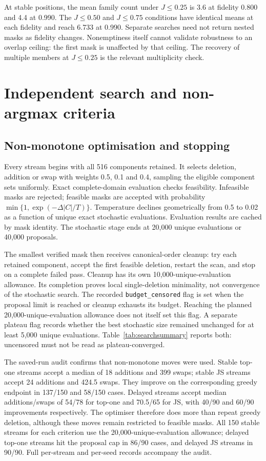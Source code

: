 \documentclass[10pt]{article}
\begin{document}
At stable positions, the mean family count under $J\leq0.25$ is 3.6 at fidelity 0.800 and 4.4 at 0.990. The $J\leq0.50$ and $J\leq0.75$ conditions have identical means at each fidelity and reach 6.733 at 0.990. Separate searches need not return nested masks as fidelity changes. Nonemptiness itself cannot validate robustness to an overlap ceiling: the first mask is unaffected by that ceiling. The recovery of multiple members at $J\leq0.25$ is the relevant multiplicity check.

\section{Independent search and non-argmax criteria}
\subsection{Non-monotone optimisation and stopping}
Every stream begins with all 516 components retained. It selects deletion, addition or swap with weights 0.5, 0.1 and 0.4, sampling the eligible component sets uniformly. Exact complete-domain evaluation checks feasibility. Infeasible masks are rejected; feasible masks are accepted with probability $\min\{1,\exp(-\Delta|C|/T)\}$. Temperature declines geometrically from 0.5 to 0.02 as a function of unique exact stochastic evaluations. Evaluation results are cached by mask identity. The stochastic stage ends at 20,000 unique evaluations or 40,000 proposals.

The smallest verified mask then receives canonical-order cleanup: try each retained component, accept the first feasible deletion, restart the scan, and stop on a complete failed pass. Cleanup has its own 10,000-unique-evaluation allowance. Its completion proves local single-deletion minimality, not convergence of the stochastic search. The recorded \texttt{budget\_censored} flag is set when the proposal limit is reached or cleanup exhausts its budget. Reaching the planned 20,000-unique-evaluation allowance does not itself set this flag. A separate plateau flag records whether the best stochastic size remained unchanged for at least 5,000 unique evaluations. Table~\ref{tab:searchsummary} reports both: uncensored must not be read as plateau-converged.



The saved-run audit confirms that non-monotone moves were used. Stable top-one streams accept a median of 18 additions and 399 swaps; stable JS streams accept 24 additions and 424.5 swaps. They improve on the corresponding greedy endpoint in 137/150 and 58/150 cases. Delayed streams accept median additions/swaps of 54/78 for top-one and 70.5/65 for JS, with 40/90 and 60/90 improvements respectively. The optimiser therefore does more than repeat greedy deletion, although these moves remain restricted to feasible masks. All 150 stable streams for each criterion use the 20,000-unique-evaluation allowance; delayed top-one streams hit the proposal cap in 86/90 cases, and delayed JS streams in 90/90. Full per-stream and per-seed records accompany the audit.
\end{document}
